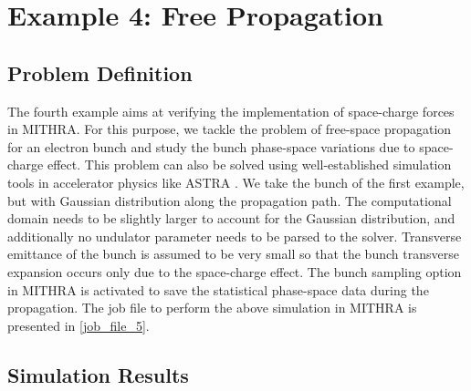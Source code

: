 \section{Example 4: Free Propagation}

\subsection{Problem Definition}

The fourth example aims at verifying the implementation of space-charge forces in MITHRA.
%
For this purpose, we tackle the problem of free-space propagation for an electron bunch and study the bunch phase-space variations due to space-charge effect.
%
This problem can also be solved using well-established simulation tools in accelerator physics like ASTRA \cite{flottmann2011astra}.
%
We take the bunch of the first example, but with Gaussian distribution along the propagation path.
%
The computational domain needs to be slightly larger to account for the Gaussian distribution, and additionally no undulator parameter needs to be parsed to the solver.
%
Transverse emittance of the bunch is assumed to be very small so that the bunch transverse expansion occurs only due to the space-charge effect.
%
The bunch sampling option in MITHRA is activated to save the statistical phase-space data during the propagation.
%
The job file to perform the above simulation in MITHRA is presented in \ref{job_file_5}.

\subsection{Simulation Results}

